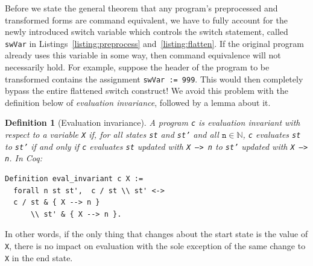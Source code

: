 \documentclass[compsoc,conference,a4paper,10pt,times]{IEEEtran}
\newtheorem{defin}[theorem]{Definition}
\newtheorem{example}[theorem]{Example}
\begin{document}


Before we state the general theorem that any program's preprocessed and transformed forms are command equivalent, we have to fully account for the newly introduced switch variable which controls the switch statement, called \texttt{swVar} in Listings~\ref{listing:preprocess} and~\ref{listing:flatten}. If the original program already uses this variable in some way, then command equivalence will not necessarily hold. For example, suppose the header of the program to be transformed contains the assignment \texttt{swVar := 999}.  This would then completely bypass the entire flattened switch construct!  We avoid this problem with the definition below of \emph{evaluation invariance}, followed by a lemma about it.

\begin{defin}[Evaluation invariance]
A program \texttt{c} is \emph{evaluation invariant} with respect to a variable \texttt{X} if, for all states \texttt{st} and \texttt{st'} and all $\mathtt{n} \in \mathbb{N}$, \texttt{c} evaluates \texttt{st} to \texttt{st'} if and only if \texttt{c} evaluates \texttt{st} updated with \texttt{X --> n} to \texttt{st'} updated with \texttt{X --> n}.
In Coq:
\begin{verbatim}
Definition eval_invariant c X := 
  forall n st st',  c / st \\ st' <-> 
  c / st & { X --> n } 
      \\ st' & { X --> n }.
\end{verbatim}
\end{defin}
In other words, if the only thing that changes about the start state is the value of \texttt{X}, there is no impact on evaluation with the sole exception of the same change to \texttt{X} in the end state.  
\end{document}

